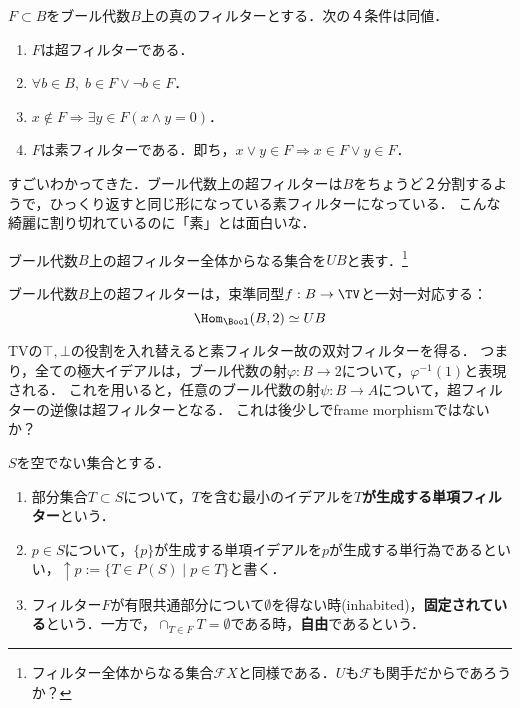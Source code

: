 \documentclass[uplatex,dvipdfmx]{jsreport}
\begin{document}
\begin{lemma}[ブール代数上の超フィルターの特徴付け]
    $F\subset B$をブール代数$B$上の真のフィルターとする．次の４条件は同値．
    \begin{enumerate}
        \item $F$は超フィルターである．
        \item $\forall b\in B,\;b\in F\lor\lnot b\in F$．
        \item $x\notin F\Rightarrow \exists y\in F(x\land y=0)$．
        \item $F$は素フィルターである．即ち，$x\lor y\in F\Rightarrow x\in F\lor y\in F$．
    \end{enumerate}
\end{lemma}
\begin{remark}
    すごいわかってきた．ブール代数上の超フィルターは$B$をちょうど２分割するようで，ひっくり返すと同じ形になっている素フィルターになっている．
    こんな綺麗に割り切れているのに「素」とは面白いな．
\end{remark}

\begin{notation}
    ブール代数$B$上の超フィルター全体からなる集合を$UB$と表す．\footnote{フィルター全体からなる集合$\mathcal{F}X$と同様である．$U$も$\mathcal{F}$も関手だからであろうか？}
\end{notation}

\begin{proposition}[ブール代数上のフィルターはTVによって表現される]
    ブール代数$B$上の超フィルターは，束準同型$f:B\to\TV$と一対一対応する：
    \[\Hom_\Bool(B,2)\simeq UB\]
\end{proposition}
\begin{remark}
    TVの$\top,\bot$の役割を入れ替えると素フィルター故の双対フィルターを得る．
    つまり，全ての極大イデアルは，ブール代数の射$\varphi:B\to 2$について，$\varphi^{-1}(1)$と表現される．
    これを用いると，任意のブール代数の射$\psi:B\to A$について，超フィルターの逆像は超フィルターとなる．
    これは後少しでframe morphismではないか？
\end{remark}

\begin{definition}
    $S$を空でない集合とする．
    \begin{enumerate}
        \item 部分集合$T\subset S$について，$T$を含む最小のイデアルを\textbf{$T$が生成する単項フィルター}という．
        \item $p\in S$について，$\{p\}$が生成する単項イデアルを$p$が生成する単行為であるといい，$\uparrow p:=\{T\in P(S)\mid p\in T\}$と書く．
        \item フィルター$F$が有限共通部分について$\emptyset$を得ない時(inhabited)，\textbf{固定されている}という．一方で，$\cap_{T\in F}T=\emptyset$である時，\textbf{自由}であるという．
    \end{enumerate}
\end{definition}
\end{document}
